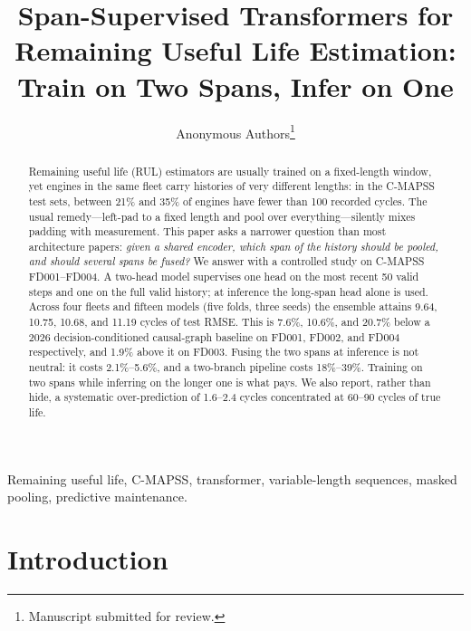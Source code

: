 \documentclass[journal,10pt]{IEEEtran}
\begin{document}
\title{Span-Supervised Transformers for Remaining Useful Life Estimation:\\ Train on Two Spans, Infer on One}

\author{Anonymous Authors\thanks{Manuscript submitted for review.}}


\maketitle

\begin{abstract}
Remaining useful life (RUL) estimators are usually trained on a fixed-length
window, yet engines in the same fleet carry histories of very different lengths:
in the C-MAPSS test sets, between 21\% and 35\% of engines have fewer than 100
recorded cycles. The usual remedy---left-pad to a fixed length and pool over
everything---silently mixes padding with measurement. This paper asks a narrower
question than most architecture papers: \emph{given a shared encoder, which span}
\emph{of the history should be pooled, and should several spans be fused?} We answer
with a controlled study on C-MAPSS FD001--FD004. A two-head model supervises one
head on the most recent 50 valid steps and one on the full valid history; at
inference the long-span head alone is used. Across four fleets and fifteen models
(five folds, three seeds) the ensemble attains 9.64, 10.75, 10.68, and 11.19
cycles of test RMSE. This is 7.6\%, 10.6\%, and 20.7\% below a 2026
decision-conditioned causal-graph baseline on FD001, FD002, and FD004
respectively, and 1.9\% above it on FD003. Fusing the two spans at inference is not
neutral: it costs 2.1\%--5.6\%, and a two-branch pipeline costs 18\%--39\%. Training
on two spans while inferring on the longer one is what pays. We also report,
rather than hide, a systematic over-prediction of 1.6--2.4 cycles concentrated at
60--90 cycles of true life.
\end{abstract}

\begin{IEEEkeywords}
Remaining useful life, C-MAPSS, transformer, variable-length sequences, masked
pooling, predictive maintenance.
\end{IEEEkeywords}

\section{Introduction}
\end{document}
